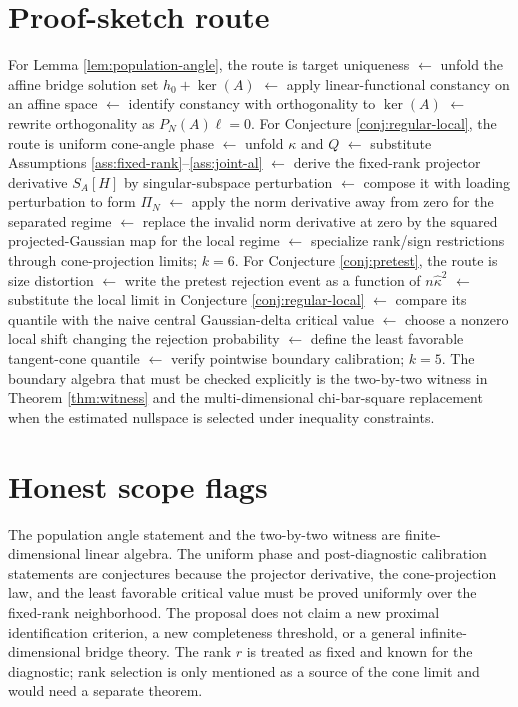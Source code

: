 \documentclass[11pt]{article}
\theoremstyle{definition}
\theoremstyle{plain}
\theoremstyle{remark}
\begin{document}
\section{Proof-sketch route}
For Lemma \ref{lem:population-angle}, the route is target uniqueness \(\leftarrow\) unfold the affine bridge solution set \(h_0+\ker(A)\) \(\leftarrow\) apply linear-functional constancy on an affine space \(\leftarrow\) identify constancy with orthogonality to \(\ker(A)\) \(\leftarrow\) rewrite orthogonality as \(P_N(A)\ell=0\). For Conjecture \ref{conj:regular-local}, the route is uniform cone-angle phase \(\leftarrow\) unfold \(\kappa\) and \(Q\) \(\leftarrow\) substitute Assumptions \ref{ass:fixed-rank}--\ref{ass:joint-al} \(\leftarrow\) derive the fixed-rank projector derivative \(S_A[H]\) by singular-subspace perturbation \(\leftarrow\) compose it with loading perturbation to form \(\Pi_N\) \(\leftarrow\) apply the norm derivative away from zero for the separated regime \(\leftarrow\) replace the invalid norm derivative at zero by the squared projected-Gaussian map for the local regime \(\leftarrow\) specialize rank/sign restrictions through cone-projection limits; \(k=6\). For Conjecture \ref{conj:pretest}, the route is size distortion \(\leftarrow\) write the pretest rejection event as a function of \(n\widehat\kappa^2\) \(\leftarrow\) substitute the local limit in Conjecture \ref{conj:regular-local} \(\leftarrow\) compare its quantile with the naive central Gaussian-delta critical value \(\leftarrow\) choose a nonzero local shift changing the rejection probability \(\leftarrow\) define the least favorable tangent-cone quantile \(\leftarrow\) verify pointwise boundary calibration; \(k=5\). The boundary algebra that must be checked explicitly is the two-by-two witness in Theorem \ref{thm:witness} and the multi-dimensional chi-bar-square replacement when the estimated nullspace is selected under inequality constraints.

\section{Honest scope flags}
The population angle statement and the two-by-two witness are finite-dimensional linear algebra. The uniform phase and post-diagnostic calibration statements are conjectures because the projector derivative, the cone-projection law, and the least favorable critical value must be proved uniformly over the fixed-rank neighborhood. The proposal does not claim a new proximal identification criterion, a new completeness threshold, or a general infinite-dimensional bridge theory. The rank \(r\) is treated as fixed and known for the diagnostic; rank selection is only mentioned as a source of the cone limit and would need a separate theorem.
\end{document}
